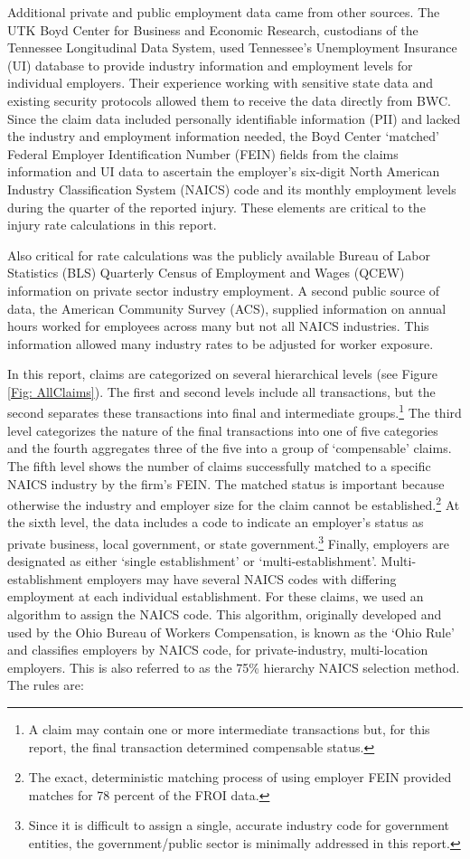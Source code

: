 \documentclass[9pt, oneside]{article}   	%
\begin{document}
\pagebreak


Additional private and public employment data came from other sources.  The UTK Boyd Center for Business and Economic Research, custodians of the Tennessee Longitudinal Data System, used Tennessee's Unemployment Insurance (UI) database to provide industry information and employment levels for individual employers.  Their experience working with sensitive state data and existing security protocols allowed them to receive the data directly from BWC. Since the claim data included personally identifiable information (PII) and lacked the industry and employment information needed, the Boyd Center `matched' Federal Employer Identification Number (FEIN) fields from the claims information and UI data to ascertain the employer's six-digit North American Industry Classification System (NAICS) code and its monthly employment levels during the quarter of the reported injury.  These elements are critical to the injury rate calculations in this report. 

Also critical for rate calculations was the publicly available Bureau of Labor Statistics (BLS) Quarterly Census of Employment and Wages (QCEW) information on private sector industry employment. A second public source of data, the American Community Survey (ACS), supplied information on annual hours worked for employees across many but not all NAICS industries. This information allowed many industry rates to be adjusted for worker exposure. 

In this report, claims are categorized on several hierarchical levels (see Figure \ref{Fig: AllClaims}). The first and second levels include all transactions, but the second separates these transactions into final and intermediate groups.\footnote{A claim may contain one or more intermediate transactions but, for this report, the final transaction determined compensable status.} The third level categorizes the nature of the final transactions into one of five categories and the fourth aggregates three of the five into a group of `compensable' claims.  The fifth level shows the number of claims successfully matched to a specific NAICS industry by the firm's FEIN. The matched status is important because otherwise the industry and employer size for the claim cannot be established.\footnote{The exact, deterministic matching process of using employer FEIN provided matches for 78 percent of the FROI data.} At the sixth level, the data includes a code to indicate an employer's status as private business, local government, or state government.\footnote{Since it is difficult to assign a single, accurate industry code for government entities, the government/public sector is minimally addressed in this report.}  Finally, employers are designated as either `single establishment' or `multi-establishment'. Multi-establishment employers may have several NAICS codes with differing employment at each individual establishment. For these claims, we used an algorithm to assign the NAICS code. This algorithm, originally developed and used by the Ohio Bureau of Workers Compensation, is known as the `Ohio Rule' and classifies employers by NAICS code, for private-industry, multi-location employers.
This is also referred to as the 75\% hierarchy NAICS selection method. The rules are:
\end{document}
